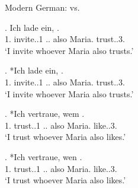 \documentclass[xcolor=dvipsnames,10pt]{beamer}
\begin{document}
\begin{frame}{Modern German:  vs. }

\exg. Ich {lade ein},    . \\
1. invite..1\scsub{[acc]} .. also Maria. trust..3\scsub{[dat]}.\\
`I invite whoever Maria also trusts.' \label{ex:mg-acc-dat}

\pause

\exg. *Ich {lade ein},    . \\
1. invite..1\scsub{[acc]} .. also Maria. trust..3\scsub{[dat]}.\\
`I invite whoever Maria also trusts.' \label{ex:mg-acc-dat-u}

\pause

\exg. *Ich vertraue, wem   . \\
1. trust..1\scsub{[dat]} .. also Maria. like..3\scsub{[acc]}.\\
`I trust whoever Maria also likes.' \label{ex:mg-dat-acc}

\pause

\exg. *Ich vertraue, wen   . \\
1. trust..1\scsub{[dat]} .. also Maria. like..3\scsub{[acc]}.\\
`I trust whoever Maria also likes.' \label{ex:mg-dat-acc-u}

\end{frame}
\end{document}
